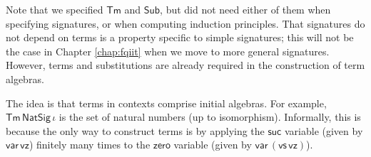 \documentclass[12pt,a4paper,twoside,openany]{book}
\theoremstyle{remark}
\theoremstyle{definition}
\theoremstyle{theorem}
\newcommand{\ms}[1]{\mathsf{#1}}
\newcommand{\Sub}{\mathsf{Sub}}
\newcommand{\Tm}{\mathsf{Tm}}
\newcommand{\var}{\ms{var}}
\newcommand{\vz}{\ms{vz}}
\newcommand{\vs}{\ms{vs}}
\begin{document}
Note that we specified $\Tm$ and $\Sub$, but did not need either of them when
specifying signatures, or when computing induction principles. That signatures
do not depend on terms is a property specific to simple signatures; this will
not be the case in Chapter \ref{chap:fqiit} when we move to more general
signatures. However, terms and substitutions are already required in the
construction of term algebras.

The idea is that terms in contexts comprise initial algebras. For example,
$\Tm\,\ms{NatSig}\,\iota$ is the set of natural numbers (up to
isomorphism). Informally, this is because the only way to construct terms is by
applying the $\ms{suc}$ variable (given by $\var\,\vz$) finitely many times to
the $\ms{zero}$ variable (given by $\var\,(\vs\,\vz)$).

\begingroup
\allowdisplaybreaks
\end{document}
